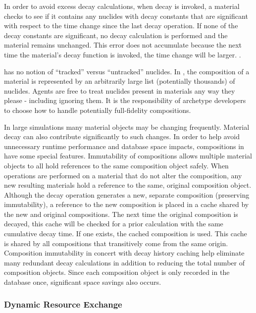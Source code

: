 In order to avoid excess decay calculations, when decay 
is invoked, a material checks to see if it contains any nuclides with decay
constants that are significant with respect to the time change since the last
decay operation.  If none of the decay constants are significant, no decay
calculation is performed and the material remains unchanged.  This error does
not accumulate because the next time the material's decay function is invoked,
the time change will be larger. 
.

\Cyclus has no notion of ``tracked'' versus ``untracked'' nuclides.  In \Cyclus, the composition of a material
is represented by an arbitrarily large list (potentially thousands) of
nuclides.  Agents are free to treat nuclides present in materials any way they
please - including ignoring them.  It is the responsibility of archetype
developers to choose how to handle potentially full-fidelity compositions.

In large simulations many material objects may be changing frequently.
Material decay can also contribute significantly to such changes.  In order to
help avoid unnecessary runtime performance and database space impacts,
compositions in \Cyclus have some special features.
Immutability of compositions allows multiple material objects to all hold
references to the same composition object safely.  When operations are
performed on a material that do not alter the composition, any new resulting
materials hold a reference to the same, original composition object.
Although the decay operation generates a new, separate composition (preserving
immutability), a reference to the new composition is placed in a cache shared
by the new and original compositions. The next time the original
composition is decayed, this cache will be checked for a prior calculation
with the same cumulative decay time.  If one exists, the cached composition is
used.  This cache is shared by all compositions that transitively come from
the same origin.  Composition immutability in concert with decay history
caching help eliminate many redundant decay calculations in addition to
reducing the total number of composition objects.  Since each composition
object is only recorded in the database once, significant space savings also
occurs. 

\subsubsection{Dynamic Resource Exchange}

